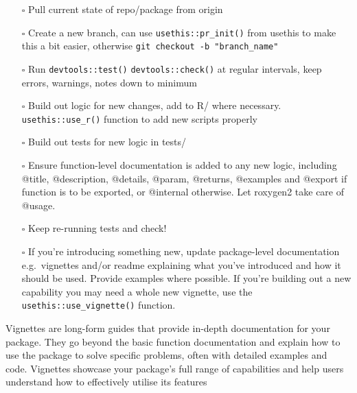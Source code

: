 \documentclass[
  letterpaper,
  DIV=11,
  numbers=noendperiod]{scrreprt}
\begin{document}
\begin{itemize}
\item[$\square$]
  Pull current state of repo/package from origin
\item[$\square$]
  Create a new branch, can use \texttt{usethis::pr\_init()} from usethis
  to make this a bit easier, otherwise
  \texttt{git\ checkout\ -b\ "branch\_name"}
\item[$\square$]
  Run \texttt{devtools::test()} \texttt{devtools::check()} at regular
  intervals, keep errors, warnings, notes down to minimum
\item[$\square$]
  Build out logic for new changes, add to R/ where necessary.
  \texttt{usethis::use\_r()} function to add new scripts properly
\item[$\square$]
  Build out tests for new logic in tests/
\item[$\square$]
  Ensure function-level documentation is added to any new logic,
  including @title, @description, @details, @param, @returns, @examples
  and @export if function is to be exported, or @internal otherwise. Let
  roxygen2 take care of @usage.
\item[$\square$]
  Keep re-running tests and check!
\item[$\square$]
  If you're introducing something new, update package-level
  documentation e.g.~vignettes and/or readme explaining what you've
  introduced and how it should be used. Provide examples where possible.
  If you're building out a new capability you may need a whole new
  vignette, use the \texttt{usethis::use\_vignette()} function.
\end{itemize}

\begin{tcolorbox}[enhanced jigsaw, opacitybacktitle=0.6, breakable, title=\textcolor{quarto-callout-tip-color}{\faLightbulb}\hspace{0.5em}{What are vignettes?}, arc=.35mm, colframe=quarto-callout-tip-color-frame, colbacktitle=quarto-callout-tip-color!10!white, left=2mm, bottomrule=.15mm, opacityback=0, toprule=.15mm, bottomtitle=1mm, toptitle=1mm, titlerule=0mm, leftrule=.75mm, colback=white, rightrule=.15mm, coltitle=black]

Vignettes are long-form guides that provide in-depth documentation for
your package. They go beyond the basic function documentation and
explain how to use the package to solve specific problems, often with
detailed examples and code. Vignettes showcase your package's full range
of capabilities and help users understand how to effectively utilise its
features

\end{tcolorbox}
\end{document}
